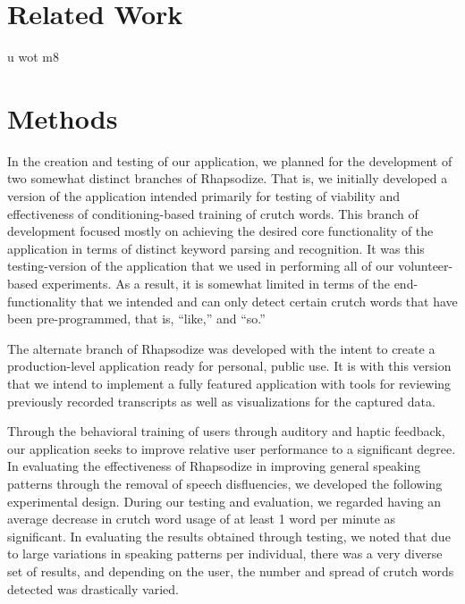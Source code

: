 \documentclass{sigchi}
\begin{document}
\section{Related Work}

u wot m8

\section{Methods}

In the creation and testing of our application, we planned for the development of two somewhat distinct branches of Rhapsodize. That is, we initially developed a version of the application intended primarily for testing of viability and effectiveness of conditioning-based training of crutch words. This branch of development focused mostly on achieving the desired core functionality of the application in terms of distinct keyword parsing and recognition. It was this testing-version of the application that we used in performing all of our volunteer-based experiments. As a result, it is somewhat limited in terms of the end-functionality that we intended and can only detect certain crutch words that have been pre-programmed, that is, “like,” and “so.”

The alternate branch of Rhapsodize was developed with the intent to create a production-level application ready for personal, public use. It is with this version that we intend to implement a fully featured application with tools for reviewing previously recorded transcripts as well as visualizations for the captured data.

Through the behavioral training of users through auditory and haptic feedback, our application seeks to improve relative user performance to a significant degree. In evaluating the effectiveness of Rhapsodize in improving general speaking patterns through the removal of speech disfluencies, we developed the following experimental design. During our testing and evaluation, we regarded having an average decrease in crutch word usage of at least 1 word per minute as significant. In evaluating the results obtained through testing, we noted that due to large variations in speaking patterns per individual, there was a very diverse set of results, and depending on the user, the number and spread of crutch words detected was drastically varied.
\end{document}
